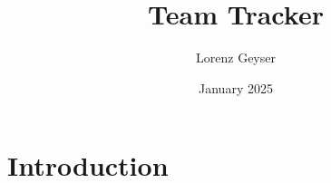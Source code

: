 \documentclass{article}
\title{Team Tracker}
\author{Lorenz Geyser}
\date{January 2025}
\begin{document}
\maketitle

\section{Introduction}
\end{document}
